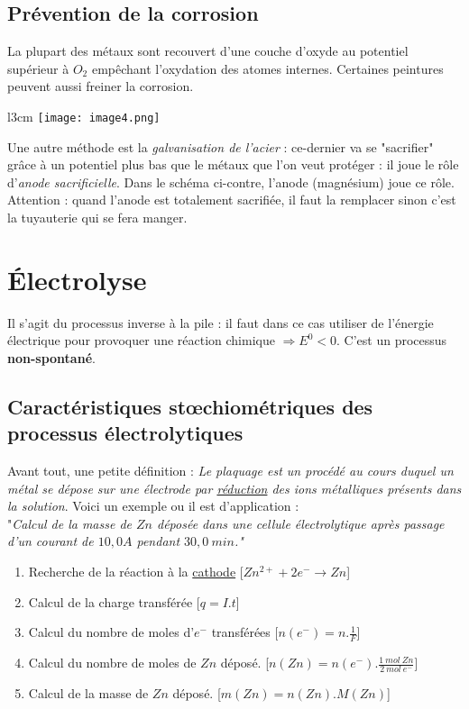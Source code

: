 \documentclass[british,french,11pt, a4paper, openany]{book}
\begin{document}
\subsection*{Prévention de la corrosion}
La plupart des métaux sont recouvert d'une couche d'oxyde au potentiel supérieur à $O_2$ empêchant l'oxydation des atomes internes. Certaines peintures peuvent aussi freiner la corrosion.\\

\begin{wrapfigure}[6]{l}{3cm}
	\texttt{[image: image4.png]}
\end{wrapfigure}
Une autre méthode est la \textit{galvanisation de l'acier} : ce-dernier va  se "sacrifier" grâce à un potentiel plus bas que le métaux que l'on veut protéger : il joue le rôle d'\textit{anode sacrificielle}. Dans le schéma ci-contre, l'anode (magnésium) joue ce rôle. Attention : quand l'anode est totalement sacrifiée, il faut la remplacer sinon c'est la tuyauterie qui se fera manger.

\section{Électrolyse}
Il s'agit du processus inverse à la pile : il faut dans ce cas utiliser de l'énergie électrique pour provoquer une réaction chimique $\Rightarrow E^0 <0$. C'est un processus \textbf{non-spontané}.

\subsection*{Caractéristiques stœchiométriques des processus électrolytiques}
Avant tout, une petite définition : \textit{Le plaquage est un procédé au cours duquel un métal se dépose sur une électrode par \underline{réduction} des ions métalliques présents dans la solution}. Voici un exemple ou il est d'application :\\

"\textit{Calcul de la masse de $Zn$ déposée dans une cellule électrolytique après passage d'un courant de $10,0A$ pendant $30,0\ min$."}
\begin{enumerate}
	\item Recherche de la réaction à la \underline{cathode} [$Zn^{2+} + 2e^- \rightarrow Zn$]
	\item Calcul de la charge transférée [$q = I.t$]
	\item Calcul du nombre de moles d'$e^-$ transférées [$n(e^-) = n.\frac{1}{F} $]
	\item Calcul du nombre de moles de $Zn$ déposé. [$n(Zn) = n(e^-).\frac{1\ mol\ Zn}{2\ mol\ e^-}$]
	\item Calcul de la masse de $Zn$ déposé. [$m(Zn) = n(Zn).M(Zn)$]
\end{enumerate}
\end{document}
